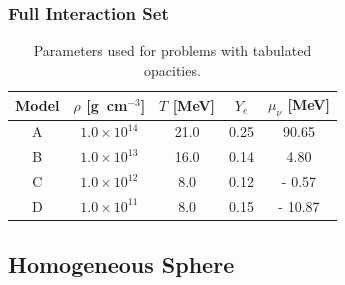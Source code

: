 \documentclass[10pt,preprint]{aastex}
\begin{document}
\subsubsection{Full Interaction Set}

\begin{table}
  \caption{Parameters used for problems with tabulated opacities. \label{tab:tabulatedModels}}
  \begin{tabular}{ccccc}
    Model & $\rho$ [g~cm$^{-3}$] & $T$ [MeV] & $Y_{e}$ & $\mu_{\nu}$ [MeV] \\
    \midrule \midrule
    A & $1.0\times10^{14}$ & 21.0  & 0.25 &   90.65 \\
    B & $1.0\times10^{13}$ & 16.0 & 0.14 &     4.80 \\
    C & $1.0\times10^{12}$ &   8.0 & 0.12 & -   0.57 \\
    D & $1.0\times10^{11}$ &   8.0 & 0.15 & - 10.87 \\
    \midrule \midrule
  \end{tabular}
\end{table}

\subsection{Homogeneous Sphere}
\end{document}
